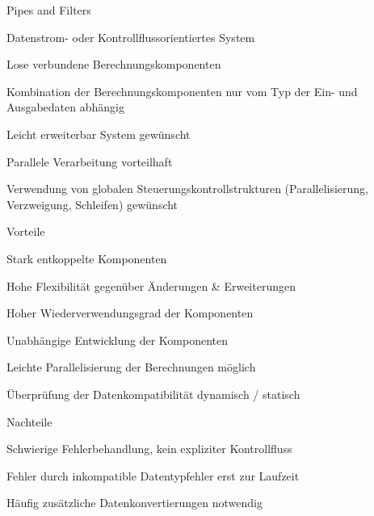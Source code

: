 \documentclass[a4paper]{article}
\begin{document}
\begin{multicols}{3}
  Pipes and Filters
  \begin{itemize*}
    \item Datenstrom- oder Kontrollflussorientiertes System
    \item Lose verbundene Berechnungskomponenten
    \item Kombination der Berechnungskomponenten nur vom Typ der Ein- und Ausgabedaten abhängig
    \item Leicht erweiterbar System gewünscht
    \item Parallele Verarbeitung vorteilhaft
    \item Verwendung von globalen Steuerungskontrollstrukturen (Parallelisierung, Verzweigung, Schleifen) gewünscht
    \item Vorteile
    \begin{itemize*}
      \item Stark entkoppelte Komponenten
      \item Hohe Flexibilität gegenüber Änderungen \& Erweiterungen
      \item Hoher Wiederverwendungsgrad der Komponenten
      \item Unabhängige Entwicklung der Komponenten
      \item Leichte Parallelisierung der Berechnungen möglich
      \item Überprüfung der Datenkompatibilität dynamisch / statisch
    \end{itemize*}
    \item Nachteile
    \begin{itemize*}
      \item Schwierige Fehlerbehandlung, kein expliziter Kontrollfluss
      \item Fehler durch inkompatible Datentypfehler erst zur Laufzeit
      \item Häufig zusätzliche Datenkonvertierungen notwendig
    \end{itemize*}
  \end{itemize*}



\end{multicols}
\end{document}
